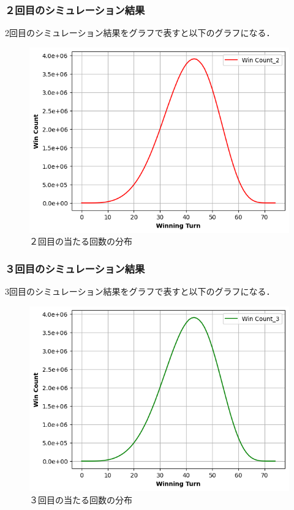 \documentclass[a4j, titlepage]{jarticle}
\begin{document}
        \subsubsection{２回目のシミュレーション結果}
        2回目のシミュレーション結果をグラフで表すと以下のグラフになる．
        \begin{figure}[htb]
          \begin{center}
            \includegraphics[scale=0.55]{../Dir_bingo_new/img_bingo2.png}
            \caption{２回目の当たる回数の分布}
            \label{img:bingo2}
          \end{center}
        \end{figure}
        \clearpage

        \subsubsection{３回目のシミュレーション結果}
        3回目のシミュレーション結果をグラフで表すと以下のグラフになる．
        \begin{figure}[htb]
          \begin{center}
            \includegraphics[scale=0.55]{../Dir_bingo_new/img_bingo3.png}
            \caption{３回目の当たる回数の分布}
            \label{img:bingo3}
          \end{center}
        \end{figure}
\end{document}
